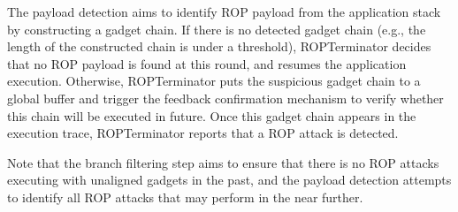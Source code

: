 The payload detection aims to identify ROP payload from the application stack by constructing a gadget chain. If there is no detected gadget chain (e.g., the length of the constructed chain is under a threshold), ROPTerminator decides that no ROP payload is found at this round, and resumes the application execution. Otherwise, ROPTerminator puts the suspicious gadget chain to a global buffer and trigger the feedback confirmation mechanism to verify whether this chain will be executed in future. Once this gadget chain appears in the execution trace, ROPTerminator reports that a ROP attack is detected.

Note that the branch filtering step aims to ensure that there is no ROP attacks executing with unaligned gadgets in the past, and the payload detection attempts to identify all ROP attacks that may perform in the near further.





